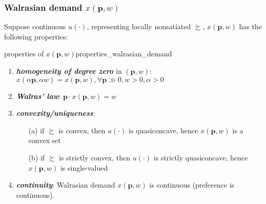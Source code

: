 \subsubsection*{Walrasian demand $ x(\mathbf{p},w)$}
Suppose continuous $u(\cdot)$, representing locally nonsatiated $\succsim$, $ x(\mathbf{p},w)$ has the following properties:
\begin{theorem}{properties of $ x(\mathbf{p},w)$}{properties_walrasian_demand}
    \begin{enumerate}
        \item \textit{\textbf{homogeneity of degree zero}} in $(\mathbf{p},w)$: $ x(\alpha\mathbf{p},\alpha w)= x(\mathbf{p},w),\forall \mathbf{p}\gg 0,w>0,\alpha>0$
        \item \textit{\textbf{Walras' law}}: $\mathbf{p}\cdot  x(\mathbf{p},w)=w$
        \item \textit{\textbf{convexity/uniqueness}}:
        \begin{enumerate}
            \item[(a)] if $\succsim$ is convex, then $u(\cdot)$ is quasiconcave, hence $ x(\mathbf{p},w)$ is a convex set
            \item[(b)] if $\succsim$ is strictly convex, then $u(\cdot)$ is strictly quasiconcave, hence $ x(\mathbf{p},w)$ is single-valued    
        \end{enumerate}
        \item \textit{\textbf{continuity}}: Walrasian demand $ x(\mathbf{p},w)$ is continuous (preference is continuous). 
    \end{enumerate}
\end{theorem}

